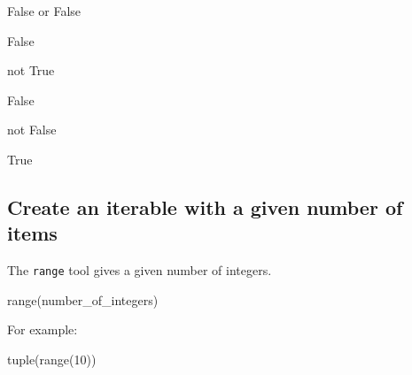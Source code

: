 \begin{pyin}
False or False
\end{pyin}





\begin{raw}
False
\end{raw}







\begin{pyin}
not True
\end{pyin}





\begin{raw}
False
\end{raw}







\begin{pyin}
not False
\end{pyin}





\begin{raw}
True
\end{raw}





\subsection{Create an iterable with a given number of items}
\label{\detokenize{tools-for-mathematics/05-combinations-permutations/how/main:creating-an-iterable-with-a-given-number-of-items}}\label{\detokenize{tools-for-mathematics/05-combinations-permutations/how/main:id4}}

The \texttt{range} tool gives a given number of integers.


\begin{pyin}
range(number_of_integers)
\end{pyin}



For example:




\begin{pyin}
tuple(range(10))
\end{pyin}





